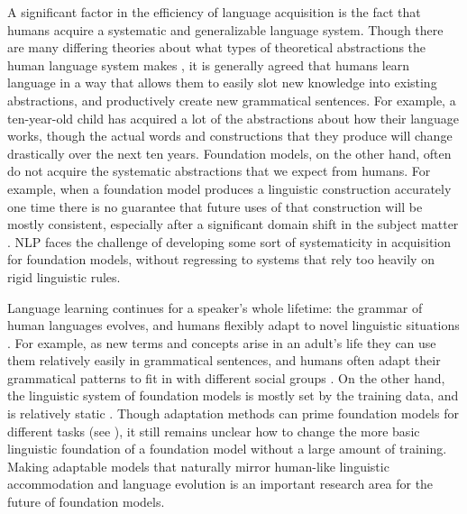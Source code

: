 A significant factor in the efficiency of language acquisition is the fact that humans acquire a systematic and generalizable language system. Though there are many differing theories about what types of theoretical abstractions the human language system makes \citep[\eg][]{comrie1989language, chomsky2014minimalist, croft2001radical, jackendoff2011human}, it is generally agreed that humans learn language in a way that allows them to easily slot new knowledge into existing abstractions, and productively create new grammatical sentences. For example, a ten-year-old child has acquired a lot of the abstractions about how their language works, though the actual words and constructions that they produce will change drastically over the next ten years. Foundation models, on the other hand, often do not acquire the systematic abstractions that we expect from humans. For example, when a foundation model produces a linguistic construction accurately one time there is no guarantee
that future uses of that construction will be mostly consistent, especially after a significant domain shift in the subject matter \citep[examples of work examining limitations of foundation models in systematicity include][]{lake2018generalization, kim2020cogs, bahdanau2018systematic, chaabouni2021can}. NLP faces the challenge of developing some sort of systematicity in acquisition for foundation models, without regressing to systems that rely too heavily on rigid linguistic rules.

Language learning continues for a speaker's whole lifetime:
the grammar of human languages evolves, and humans flexibly adapt to novel linguistic situations \citep{sankoff2018change}. For example, as new terms and concepts arise in an adult's life they can use them relatively easily in grammatical sentences, and humans often adapt their grammatical patterns to fit in with different social groups \citep{rickford1994addressee}. 
On the other hand, the linguistic system of foundation models is mostly set by the training data, and is relatively static \citep{lazaridou2021pitfalls, Khandelwal2020Generalization}. Though adaptation methods can prime foundation models for different tasks (see ), it still remains unclear how to change the more basic linguistic foundation of a foundation model without a large amount of training. 
Making adaptable models that naturally mirror human-like linguistic accommodation and language evolution is an important research area for the future of foundation models.

